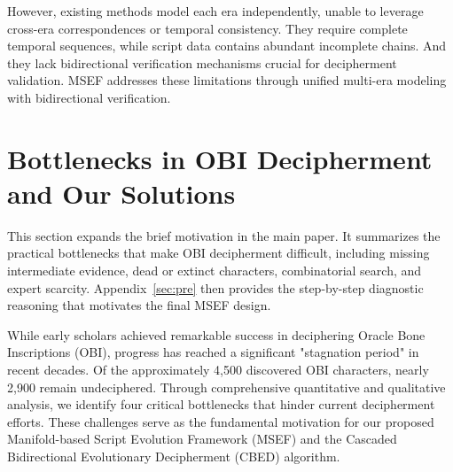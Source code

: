 \documentclass{article}
\begin{document}
However, existing methods model each era independently, unable to leverage cross-era correspondences or temporal consistency. They require complete temporal sequences, while script data contains abundant incomplete chains. And they lack bidirectional verification mechanisms crucial for decipherment validation. MSEF addresses these limitations through unified multi-era modeling with bidirectional verification.



\section{Bottlenecks in OBI Decipherment and Our Solutions}
\label{sec:bottlenecks}
This section expands the brief motivation in the main paper. It summarizes the practical bottlenecks that make OBI decipherment difficult, including missing intermediate evidence, dead or extinct characters, combinatorial search, and expert scarcity. Appendix~\ref{sec:pre} then provides the step-by-step diagnostic reasoning that motivates the final MSEF design.

While early scholars achieved remarkable success in deciphering Oracle Bone Inscriptions (OBI), progress has reached a significant "stagnation period" in recent decades. Of the approximately 4,500 discovered OBI characters, nearly 2,900 remain undeciphered. Through comprehensive quantitative and qualitative analysis, we identify four critical bottlenecks that hinder current decipherment efforts. These challenges serve as the fundamental motivation for our proposed Manifold-based Script Evolution Framework (MSEF) and the Cascaded Bidirectional Evolutionary Decipherment (CBED) algorithm.
\end{document}
